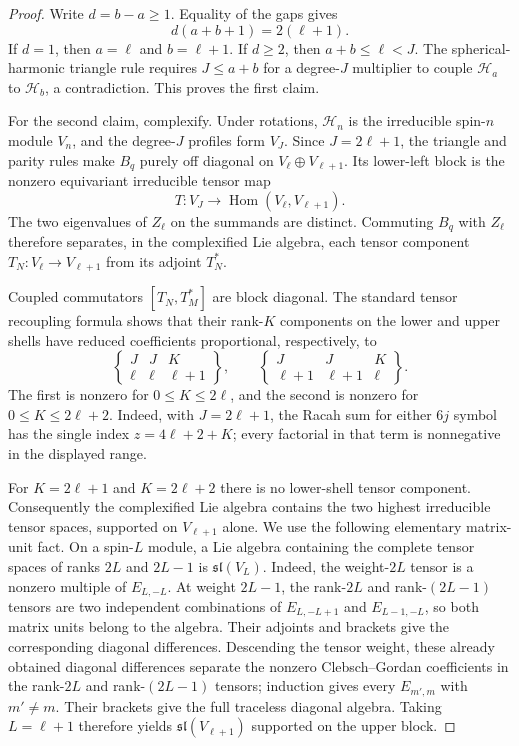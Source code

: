 \documentclass[11pt]{article}
\theoremstyle{remark}
\begin{document}
\begin{proof}
Write $d=b-a\geq1$.  Equality of the gaps gives
\[
 d(a+b+1)=2(\ell+1).
\]
If $d=1$, then $a=\ell$ and $b=\ell+1$.  If $d\geq2$, then
$a+b\leq\ell<J$.  The spherical-harmonic triangle rule requires
$J\leq a+b$ for a degree-$J$ multiplier to couple
$\mathcal H_a$ to $\mathcal H_b$, a contradiction.  This proves the first
claim.

For the second claim, complexify.  Under rotations,
$\mathcal H_n$ is the irreducible spin-$n$ module $V_n$, and the degree-$J$
profiles form $V_J$.  Since $J=2\ell+1$, the triangle and parity rules make
$B_q$ purely off diagonal on
$V_\ell\oplus V_{\ell+1}$.  Its lower-left block is the nonzero equivariant
irreducible tensor map
\[
 T:V_J\longrightarrow
 \operatorname{Hom}(V_\ell,V_{\ell+1}).
\]
The two eigenvalues of $Z_\ell$ on the summands are distinct.  Commuting
$B_q$ with $Z_\ell$ therefore separates, in the complexified Lie algebra,
each tensor component $T_N:V_\ell\to V_{\ell+1}$ from its adjoint
$T_N^\ast$.

Coupled commutators $[T_N,T_M^\ast]$ are block diagonal.  The standard
tensor recoupling formula shows that their rank-$K$ components on the lower
and upper shells have reduced coefficients proportional, respectively, to
\begin{equation}
 \begin{Bmatrix}
  J&J&K\\ \ell&\ell&\ell+1
 \end{Bmatrix},
 \qquad
 \begin{Bmatrix}
  J&J&K\\ \ell+1&\ell+1&\ell
 \end{Bmatrix}.
 \label{eq:adjacent-shell-racah-coefficients}
\end{equation}
The first is nonzero for $0\leq K\leq2\ell$, and the second is nonzero for
$0\leq K\leq2\ell+2$.  Indeed, with $J=2\ell+1$, the Racah sum for either
$6j$ symbol has the single index
$z=4\ell+2+K$; every factorial in that term is nonnegative in the displayed
range.

For $K=2\ell+1$ and $K=2\ell+2$ there is no lower-shell tensor component.
Consequently the complexified Lie algebra contains the two highest
irreducible tensor spaces, supported on $V_{\ell+1}$ alone.  We use the
following elementary matrix-unit fact.  On a spin-$L$ module, a Lie algebra
containing the complete tensor spaces of ranks $2L$ and $2L-1$ is
$\mathfrak{sl}(V_L)$.  Indeed, the weight-$2L$ tensor is a nonzero multiple
of $E_{L,-L}$.  At weight $2L-1$, the rank-$2L$ and rank-$(2L-1)$ tensors
are two independent combinations of
$E_{L,-L+1}$ and $E_{L-1,-L}$, so both matrix units belong to the algebra.
Their adjoints and brackets give the corresponding diagonal differences.
Descending the tensor weight, these already obtained diagonal differences
separate the nonzero Clebsch--Gordan coefficients in the rank-$2L$ and
rank-$(2L-1)$ tensors; induction gives every $E_{m',m}$ with $m'\neq m$.
Their brackets give the full traceless diagonal algebra.  Taking
$L=\ell+1$ therefore yields
$\mathfrak{sl}(V_{\ell+1})$ supported on the upper block.


\end{proof}
\end{document}
